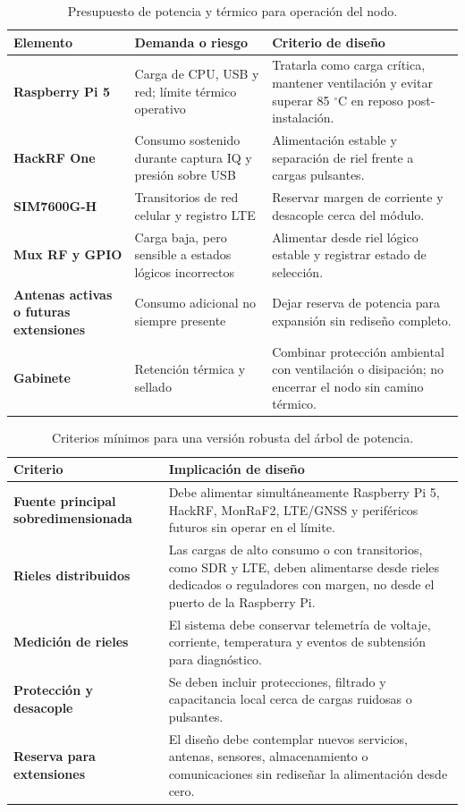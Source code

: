 \begin{table}[H]
\centering
\caption{Presupuesto de potencia y térmico para operación del nodo.}
\label{tab:hw_power_thermal_budget}
\begin{tabularx}{\textwidth}{>{\bfseries}p{3.2cm} p{3.2cm} X}
\toprule
Elemento & Demanda o riesgo & Criterio de diseño \\
\midrule
Raspberry Pi 5 & Carga de CPU, USB y red; límite térmico operativo & Tratarla como carga crítica, mantener ventilación y evitar superar 85 $^\circ$C en reposo post-instalación. \\
HackRF One & Consumo sostenido durante captura IQ y presión sobre USB & Alimentación estable y separación de riel frente a cargas pulsantes. \\
SIM7600G-H & Transitorios de red celular y registro LTE & Reservar margen de corriente y desacople cerca del módulo. \\
Mux RF y GPIO & Carga baja, pero sensible a estados lógicos incorrectos & Alimentar desde riel lógico estable y registrar estado de selección. \\
Antenas activas o futuras extensiones & Consumo adicional no siempre presente & Dejar reserva de potencia para expansión sin rediseño completo. \\
Gabinete & Retención térmica y sellado & Combinar protección ambiental con ventilación o disipación; no encerrar el nodo sin camino térmico. \\
\bottomrule
\end{tabularx}
\end{table}

\begin{table}[H]
\centering
\caption{Criterios mínimos para una versión robusta del árbol de potencia.}
\label{tab:hw_power_tree}
\begin{tabularx}{\textwidth}{>{\bfseries}p{3.4cm} X}
\toprule
Criterio & Implicación de diseño \\
\midrule
Fuente principal sobredimensionada & Debe alimentar simultáneamente Raspberry Pi 5, HackRF, MonRaF2, LTE/GNSS y periféricos futuros sin operar en el límite. \\
Rieles distribuidos & Las cargas de alto consumo o con transitorios, como SDR y LTE, deben alimentarse desde rieles dedicados o reguladores con margen, no desde el puerto de la Raspberry Pi. \\
Medición de rieles & El sistema debe conservar telemetría de voltaje, corriente, temperatura y eventos de subtensión para diagnóstico. \\
Protección y desacople & Se deben incluir protecciones, filtrado y capacitancia local cerca de cargas ruidosas o pulsantes. \\
Reserva para extensiones & El diseño debe contemplar nuevos servicios, antenas, sensores, almacenamiento o comunicaciones sin rediseñar la alimentación desde cero. \\
\bottomrule
\end{tabularx}
\end{table}

